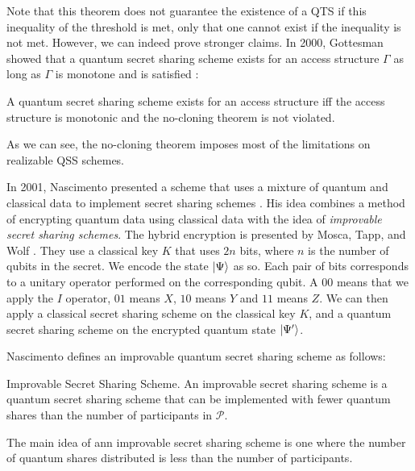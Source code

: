 Note that this theorem does not guarantee the existence of a QTS if this inequality of the threshold is met, only that one cannot exist if the inequality is not met. However, we can indeed prove stronger claims. In 2000, Gottesman showed that a quantum secret sharing scheme exists for an access structure $\Gamma$ as long as $\Gamma$ is monotone and  is satisfied \cite{gottesman_theory_2000}:

\begin{theorem}
    \label{thm:monotone-gamma}
    A quantum secret sharing scheme exists for an access structure iff the access structure is monotonic and the no-cloning theorem is not violated.
\end{theorem}

As we can see, the no-cloning theorem imposes most of the limitations on realizable QSS schemes. 

In 2001, Nascimento presented a scheme that uses a mixture of quantum and classical data to implement secret sharing schemes \cite{nascimento_improving_2001}. His idea combines a method of encrypting quantum data using classical data with the idea of \textit{improvable secret sharing schemes}. The hybrid encryption is presented by Mosca, Tapp, and Wolf \cite{mosca2000private}. They use a classical key $K$ that uses $2n$ bits, where $n$ is the number of qubits in the secret. We encode the state $\ket{\Psi}$ as so. Each pair of bits corresponds to a unitary operator performed on the corresponding qubit. A $00$ means that we apply the $I$ operator, $01$ means $X$, $10$ means $Y$ and $11$ means $Z$. We can then apply a classical secret sharing scheme on the classical key $K$, and a quantum secret sharing scheme on the encrypted quantum state $\ket{\Psi '}$.

Nascimento defines an improvable quantum secret sharing scheme as follows:

\begin{definition}{Improvable Secret Sharing Scheme.}
    \label{defn:improvable}
    An improvable secret sharing scheme is a quantum secret sharing scheme that can be implemented with fewer quantum shares than the number of participants in $\mathcal{P}$.
\end{definition}

The main idea of ann improvable secret sharing scheme is one where the number of quantum shares distributed is less than the number of participants.

